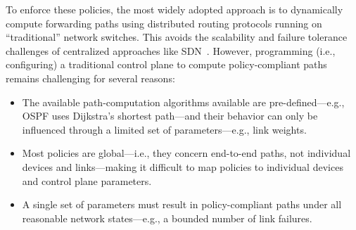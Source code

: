 
To enforce these policies, the most widely adopted approach is to
dynamically compute forwarding paths using distributed routing protocols
running on ``traditional'' network switches.
This avoids the scalability and failure tolerance 
challenges of centralized approaches like SDN~\cite{onos, hasdn, propane}. However, programming (i.e.,
configuring) a traditional control plane to compute policy-compliant paths
remains challenging for several reasons: 
\begin{itemize}
\item The available path-computation algorithms
available are pre-defined---e.g., OSPF uses
Dijkstra's shortest path---and their behavior can only be influenced
through a limited set of parameters---e.g.,
link weights. 
\item Most policies are
global---i.e., they concern end-to-end paths, not individual devices and
links---making it difficult to map policies to
individual devices and control plane parameters.
\item A single set of parameters must result in
policy-compliant paths under all reasonable network states---e.g., a bounded
number of link failures.
\end{itemize}

